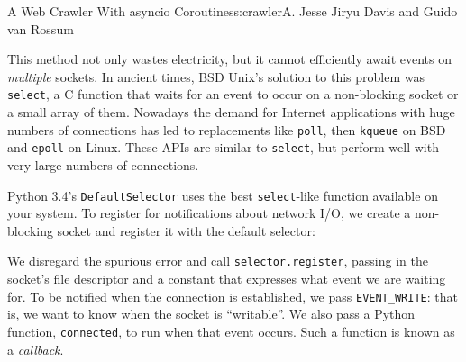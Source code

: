 \begin{aosachapter}{A Web Crawler With asyncio Coroutines}{s:crawler}{A. Jesse Jiryu Davis and Guido van Rossum}
\begin{Shaded}
\begin{Highlighting}[]
 \NormalTok{:}
    \NormalTok{:}
          
       

\NormalTok{(}\NormalTok{)}
\end{Highlighting}
\end{Shaded}

This method not only wastes electricity, but it cannot efficiently await
events on \emph{multiple} sockets. In ancient times, BSD Unix's solution
to this problem was \texttt{select}, a C function that waits for an
event to occur on a non-blocking socket or a small array of them.
Nowadays the demand for Internet applications with huge numbers of
connections has led to replacements like \texttt{poll}, then
\texttt{kqueue} on BSD and \texttt{epoll} on Linux. These APIs are
similar to \texttt{select}, but perform well with very large numbers of
connections.

Python 3.4's \texttt{DefaultSelector} uses the best \texttt{select}-like
function available on your system. To register for notifications about
network I/O, we create a non-blocking socket and register it with the
default selector:

\begin{Shaded}
\begin{Highlighting}[]
  


\NormalTok{)}
\NormalTok{:}
    \NormalTok{((}\NormalTok{, }\NormalTok{))}
 \NormalTok{:}

 
    \NormalTok{(}\NormalTok{)}

\end{Highlighting}
\end{Shaded}

We disregard the spurious error and call \texttt{selector.register},
passing in the socket's file descriptor and a constant that expresses
what event we are waiting for. To be notified when the connection is
established, we pass \texttt{EVENT\_WRITE}: that is, we want to know
when the socket is ``writable''. We also pass a Python function,
\texttt{connected}, to run when that event occurs. Such a function is
known as a \emph{callback}.


\end{aosachapter}
